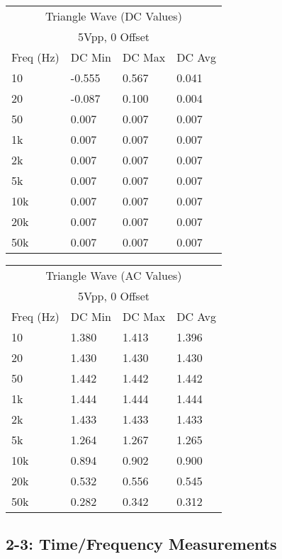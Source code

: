 \documentclass[%
 aip,
 jmp,
 amsmath,
 amssymb,
 reprint,%
 numerical,
 longbibliography,
]{revtex4-1}
\begin{document}
		\begin{tabularx}{0.45\textwidth}[t]{| X | X | X | X |}
		\hline
		\multicolumn{4}{|c|}{Triangle Wave (DC Values)}\\
		\multicolumn{4}{|c|}{5Vpp, 0 Offset}\\		
		\hline
			\multicolumn{1}{|c|}{Freq (Hz)} & 
			\multicolumn{1}{c|}{DC Min} & 
			\multicolumn{1}{c|}{DC Max} &
			\multicolumn{1}{c|}{DC Avg} \\ 
		\hline
		10 & -0.555 & 0.567 & 0.041 \\ \hline
		20 & -0.087 & 0.100 & 0.004 \\ \hline
		50 & 0.007 & 0.007 & 0.007 \\ \hline
		1k & 0.007 & 0.007 & 0.007 \\ \hline
		2k & 0.007 & 0.007 & 0.007 \\ \hline
		5k & 0.007 & 0.007 & 0.007 \\ \hline
		10k & 0.007 & 0.007 & 0.007 \\ \hline
		20k & 0.007 & 0.007 & 0.007 \\ \hline
		50k & 0.007 & 0.007 & 0.007 \\ \hline
		\end{tabularx}
	
	\begin{tabularx}{0.45\textwidth}[t]{| X | X | X | X |}
	\hline
	\multicolumn{4}{|c|}{Triangle Wave (AC Values)}\\
	\multicolumn{4}{|c|}{5Vpp, 0 Offset}\\
	\hline
		\multicolumn{1}{|c|}{Freq (Hz)} & 
		\multicolumn{1}{c|}{DC Min} & 
		\multicolumn{1}{c|}{DC Max} &
		\multicolumn{1}{c|}{DC Avg} \\ 
	\hline
	10  & 1.380 & 1.413 & 1.396\\ \hline		
	20  & 1.430 & 1.430 & 1.430\\ \hline
	50  & 1.442 & 1.442 & 1.442\\ \hline
	1k  & 1.444 & 1.444 & 1.444\\ \hline
	2k  & 1.433 & 1.433 & 1.433\\ \hline
	5k  & 1.264 & 1.267 & 1.265\\ \hline
	10k & 0.894 & 0.902 & 0.900\\ \hline
	20k & 0.532 & 0.556 & 0.545\\ \hline
	50k & 0.282 & 0.342 & 0.312\\ \hline
	\end{tabularx}
	
	\subsection{2-3: Time/Frequency Measurements}
	
\end{document}
